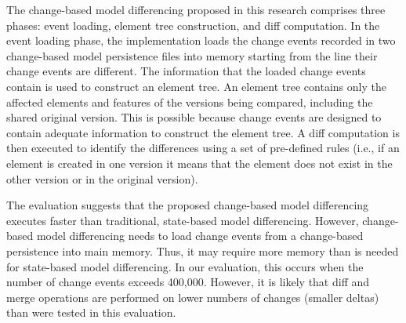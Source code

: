 The change-based model differencing proposed in this research comprises three phases: event loading, element tree construction, and diff computation. In the event loading phase, the implementation loads the change events recorded in two change-based model persistence files into memory starting from the line their change events are different. The information that the loaded change events contain is used to construct an element tree. An element tree contains only the affected elements and features of the versions being compared, including the shared original version. This is possible because change events are designed to contain adequate information to construct the element tree. A diff computation is then executed to identify the differences using a set of pre-defined rules (i.e., if an element is created in one version it means that the element does not exist in the other version or in the original version).

The evaluation suggests that the proposed change-based model differencing executes faster than traditional, state-based model differencing.
However, change-based model differencing needs to load change events from a change-based persistence into main memory. Thus, it may require more memory than is needed for state-based model differencing. In our evaluation, this occurs when the number of change events exceeds 400,000. However, it is likely that diff and merge operations are performed on lower numbers of changes (smaller deltas) than were tested in this evaluation.

